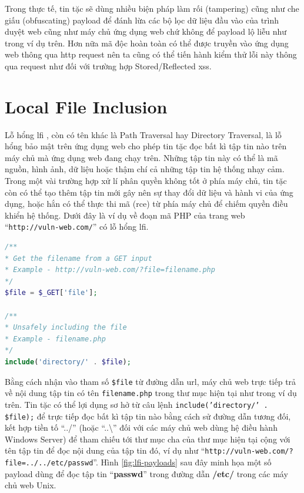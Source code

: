 Trong thực tế, tin tặc sẽ dùng nhiều biện pháp làm rối (tampering) cũng như che giấu (obfuscating) payload để đánh lừa các bộ lọc dữ liệu đầu vào của trình duyệt web cũng như máy chủ ứng dụng web chứ không để payload lộ liễu như trong ví dụ trên. Hơn nữa mã độc hoàn toàn có thể được truyền vào ứng dụng web thông qua \acrshort{http} request nên ta cũng có thể tiến hành kiểm thử lỗi này thông qua request như đối với trường hợp Stored/Reflected \acrshort{xss}. 

\section{Local File Inclusion}
Lỗ hổng \acrfull{lfi} \parencite{portswigger-directory-traversal, owasp-path-traversal, sullivan2011web}, còn có tên khác là Path Traversal hay Directory Traversal, là lỗ hổng bảo mật trên ứng dụng web cho phép tin tặc đọc bất kì tập tin nào trên máy chủ mà ứng dụng web đang chạy trên. Những tập tin này có thể là mã nguồn, hình ảnh, dữ liệu hoặc thậm chí cả những tập tin hệ thống nhạy cảm. Trong một vài trường hợp xử lí phân quyền không tốt ở phía máy chủ, tin tặc còn có thể tạo thêm tập tin mới gây nên sự thay đổi dữ liệu và hành vi của ứng dụng, hoặc hắn có thể thực thi mã (\acrshort{rce}) từ phía máy chủ để chiếm quyền điều khiển hệ thống. Dưới đây là ví dụ về đoạn mã PHP của trang web ``\texttt{http://vuln-web.com/}'' có lỗ hổng \acrshort{lfi}.
\begin{lstlisting}[language=php]
/**
* Get the filename from a GET input
* Example - http://vuln-web.com/?file=filename.php
*/
$file = $_GET['file'];

/**
* Unsafely including the file
* Example - filename.php
*/
include('directory/' . $file);
\end{lstlisting}
Bằng cách nhận vào tham số \texttt{\$file} từ đường dẫn \acrshort{url}, máy chủ web trực tiếp trả về nội dung tập tin có tên \texttt{filename.php} trong thư mục hiện tại như trong ví dụ trên. Tin tặc có thể lợi dụng sơ hở từ câu lệnh \texttt{include('directory/' . \$file);} để trực tiếp đọc bất kì tập tin nào bằng cách sử đường dẫn tương đối, kết hợp tiền tố ``../'' (hoặc ``..\textbackslash'' đối với các máy chủ web dùng hệ điều hành Windows Server) để tham chiếu tới thư mục cha của thư mục hiện tại cộng với tên tập tin để đọc nội dung của tập tin đó, ví dụ như ``\texttt{http://vuln-web.com/?file=../../etc/passwd}''. Hình \ref{fig:lfi-payloads} sau đây minh họa một số payload dùng để đọc tập tin ``\textbf{passwd}'' trong đường dẫn \textbf{/etc/} trong các máy chủ web Unix.
